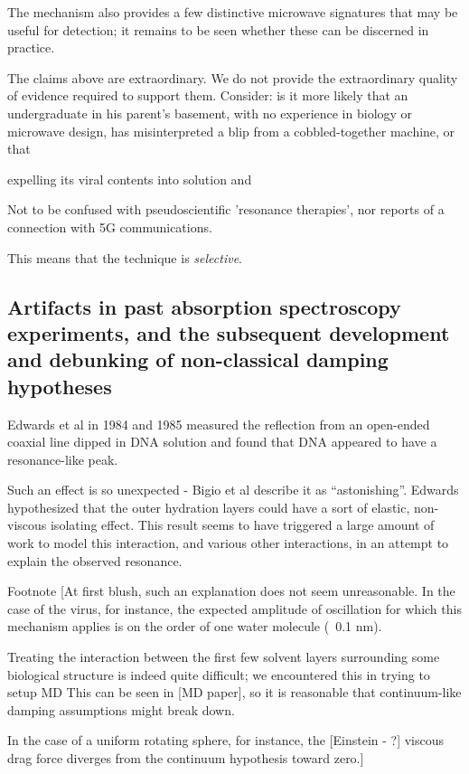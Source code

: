 \documentclass[paper.tex]{subfiles}
\begin{document}
The mechanism also provides a few distinctive microwave signatures that may be useful for detection; it remains to be seen whether these can be discerned in practice.

The claims above are extraordinary. We do not provide the extraordinary quality of evidence required to support them. Consider: is it more likely that an undergraduate in his parent's basement, with no experience in biology or microwave design, has misinterpreted a blip from a cobbled-together machine, or that 

expelling its viral contents into solution and 

Not to be confused with pseudoscientific 'resonance therapies', nor reports of a connection with 5G communications.

This means that the technique is {\it selective}.





\subsection{Artifacts in past absorption spectroscopy experiments, and the subsequent development and debunking of non-classical damping hypotheses}

Edwards et al in 1984 and 1985 measured the reflection from an open-ended coaxial line dipped in DNA solution and found that DNA appeared to have a resonance-like peak.

Such an effect is so unexpected - Bigio et al describe it as “astonishing”. Edwards hypothesized that the outer hydration layers could have a sort of elastic, non-viscous isolating effect. This result seems to have triggered a large amount of work to model this interaction, and various other interactions, in an attempt to explain the observed resonance.

Footnote [At first blush, such an explanation does not seem unreasonable. In the case of the virus, for instance, the expected amplitude of oscillation for which this mechanism applies is on the order of one water molecule (~0.1 nm).

Treating the interaction between the first few solvent layers surrounding some biological structure is indeed quite difficult; we encountered this in trying to setup MD This can be seen in [MD paper], so it is reasonable that continuum-like damping assumptions might break down. 

In the case of a uniform rotating sphere, for instance, the [Einstein - ?] viscous drag force diverges from the continuum hypothesis toward zero.]
\end{document}
